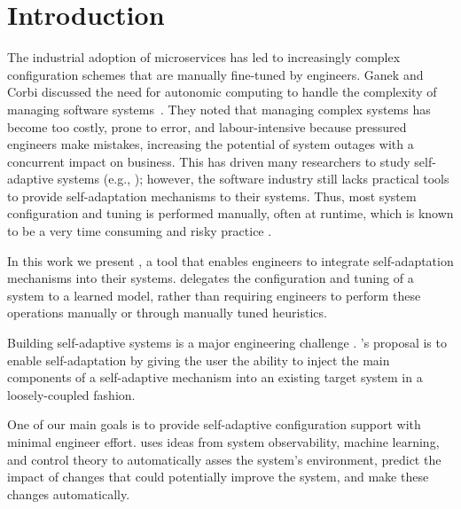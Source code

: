 
\section{Introduction}
\label{sec:introduction}

The industrial adoption of microservices has led to increasingly complex configuration schemes that are manually fine-tuned by engineers. Ganek and Corbi discussed the need for autonomic computing to handle the complexity of managing software systems~\cite{ganek_dawning_2003}. They noted that managing complex systems has become too costly, prone to error, and labour-intensive because pressured engineers make mistakes, increasing the potential of system outages with a concurrent impact on business. This has driven many researchers to study self-adaptive systems (e.g., \cite{porter_rex:_2016, andrew_pavlo_self-driving_2017, salehie_self-adaptive_2009, ganapathi_predicting_2009, herbst_self-adaptive_2014, faniyi_architecting_2014}); however, the software industry still lacks practical tools to provide self-adaptation mechanisms to their systems. Thus, most system configuration and tuning is performed manually, often at runtime, which is known to be a very time consuming and risky practice \cite{ganek_dawning_2003, using_prob_reasoning_automate_software_tuning, de_lemos_software_2013}.

In this work we present \projectname{}, a tool that enables engineers to integrate self-adaptation mechanisms into their systems. \projectname{} delegates the configuration and tuning of a system to a learned model, rather than requiring engineers to perform these operations manually or through manually tuned heuristics.

Building self-adaptive systems is a major engineering challenge \cite{brun_engineering_2009}. \projectname{}'s proposal is to enable self-adaptation by giving the user the ability to inject the main components of a self-adaptive mechanism into an existing target system in a loosely-coupled fashion.

One of our main goals is to provide self-adaptive configuration support with minimal engineer effort. \projectname{} uses ideas from system observability, machine learning, and control theory to automatically asses the system's environment, predict the impact of changes that could potentially improve the system, and make these changes automatically.

